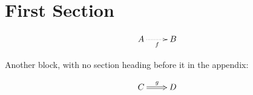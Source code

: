 \documentclass{article}
\begin{document}
\section{First Section}
\begin{toappendix}
\begin{displaymath}
  \xymatrix{A\ar@{.>}[r]_f & B}
\end{displaymath}
\end{toappendix}
Another block, with no section heading before it in the appendix:
\begin{toappendix}
\begin{displaymath}
  \xymatrix{C\ar@{=>}[r]^g & D}
\end{displaymath}
\end{toappendix}
\end{document}
